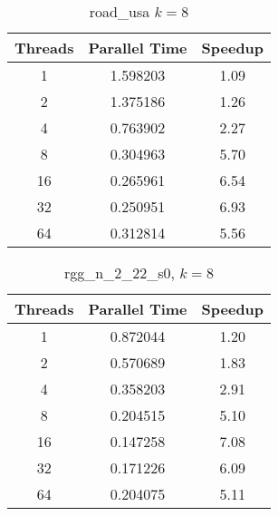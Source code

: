 \documentclass{article}
\begin{document}
\begin{figure}[H]
    \begin{minipage}{0.45\textwidth}
    \begin{table}[H]
    \begin{center}
        \begin{tabular}{|c|c|c|}
            \hline
            Threads & Parallel Time & Speedup \\
            \hline
            1 & 1.598203 & 1.09 \\
            2 & 1.375186 & 1.26 \\
            4 & 0.763902 & 2.27 \\
            8 & 0.304963 & 5.70 \\
            16 & 0.265961 & 6.54 \\
            32 & 0.250951 & 6.93 \\
            64 & 0.312814 & 5.56 \\
            \hline
        \end{tabular}
    \caption{road\_usa \(  k = 8 \)}
    \end{center}
    \end{table}
    \end{minipage}
    \begin{minipage}{0.45\textwidth}
    \begin{table}[H]
\begin{center}
    \begin{tabular}{|c|c|c|}
        \hline
        Threads & Parallel Time & Speedup \\
        \hline
        1 & 0.872044 & 1.20 \\
        2 & 0.570689 & 1.83 \\
        4 & 0.358203 & 2.91 \\
        8 & 0.204515 & 5.10 \\
        16 & 0.147258 & 7.08 \\
        32 & 0.171226 & 6.09 \\
        64 & 0.204075 & 5.11 \\
        \hline
    \end{tabular}
\caption{rgg\_n\_2\_22\_s0, \( k = 8 \)}
\end{center}
\end{table}
\end{minipage}
\newline
\begin{minipage}{0.45\textwidth}
    \begin{table}[H]

\end{table}
\end{minipage}
\end{figure}
\end{document}
